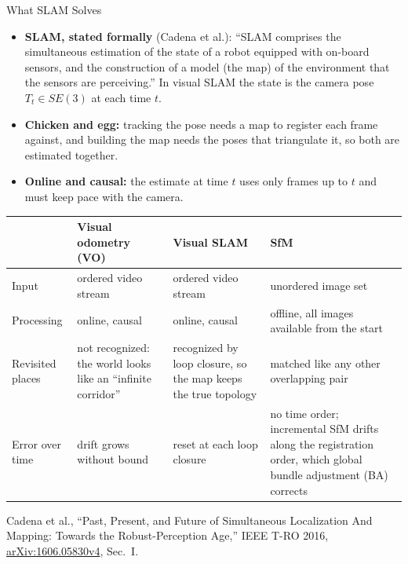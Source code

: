 \begin{frame}{What SLAM Solves}
  \begin{itemize}\footnotesize\itemsep0.3em
    \item \textbf{SLAM, stated formally} (Cadena et al.): ``SLAM comprises the simultaneous estimation of the state of a robot equipped with on-board sensors, and the construction of a model (the map) of the environment that the sensors are perceiving.'' In visual SLAM the state is the camera pose $T_t\in SE(3)$ at each time $t$.
    \item \textbf{Chicken and egg:} tracking the pose needs a map to register each frame against, and building the map needs the poses that triangulate it, so both are estimated together.
    \item \textbf{Online and causal:} the estimate at time $t$ uses only frames up to $t$ and must keep pace with the camera.
  \end{itemize}
  \vspace{0.1em}
  {\centering\scriptsize
  \begin{tabular}{>{\raggedright\arraybackslash}p{1.8cm} >{\raggedright\arraybackslash}p{2.7cm} >{\raggedright\arraybackslash}p{2.8cm} >{\raggedright\arraybackslash}p{4.5cm}}
    \toprule
     & \textbf{Visual odometry (VO)} & \textbf{Visual SLAM} & \textbf{SfM} \\
    \midrule
    Input & ordered video stream & ordered video stream & unordered image set \\
    \addlinespace[0.1em]
    Processing & online, causal & online, causal & offline, all images available from the start \\
    \addlinespace[0.1em]
    Revisited places & not recognized: the world looks like an ``infinite corridor'' & recognized by loop closure, so the map keeps the true topology & matched like any other overlapping pair \\
    \addlinespace[0.1em]
    Error over time & drift grows without bound & reset at each loop closure & no time order; incremental SfM drifts along the registration order, which global bundle adjustment (BA) corrects \\
    \bottomrule
  \end{tabular}\par}
  \vspace{0.3em}
  {\scriptsize Cadena et al., ``Past, Present, and Future of Simultaneous Localization And Mapping: Towards the Robust-Perception Age,'' IEEE T-RO 2016, \href{https://arxiv.org/abs/1606.05830v4}{arXiv:1606.05830v4}, Sec.~I.\par}
\end{frame}

